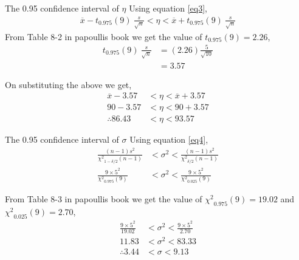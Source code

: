 \documentclass{beamer}
\begin{document}
\begin{frame}{The 0.95 confidence interval of $\eta$}
    Using equation \eqref{eq3}, 
   \begin{align}
      \overline{x} - t_{0.975}(9) \: \frac{s}{\sqrt{n}} < \eta <  \overline{x} + t_{0.975}(9) \: \frac{s}{\sqrt{n}} 
   \end{align}
   From Table 8-2 in papoullis book we get the value of $t_{0.975}(9) = 2.26$,
  \begin{align}
    t_{0.975}(9) \: \frac{s}{\sqrt{n}} &= (2.26)\frac{5}{\sqrt{10}} \\
      								  &= 3.57
  \end{align}
  
   On substituting the above we get,
   \begin{align}
      \overline{x} - 3.57 &< \eta < \overline{x} + 3.57 \\
      90 - 3.57 &< \eta < 90 + 3.57 \\
     \therefore 86.43 &< \eta < 93.57			  
   \end{align}
   
       
\end{frame}
 

\begin{frame}{The 0.95 confidence interval of $\sigma$}
   Using equation \eqref{eq4},
   \begin{align}
      \frac{(n-1) s^2}{{\chi^2}_{1- \delta/2} (n-1)} &< \sigma^2 < \frac{(n-1) s^2}{{\chi^2}_{\delta/2} (n-1)} \\
      \frac{9 \times 5^2}{{\chi^2}_{0.975} (9)} &< \sigma^2 < \frac{9 \times 5^2}{{\chi^2}_{0.025} (9)}
   \end{align}  
     
   From Table 8-3 in papoullis book we get the value of ${\chi^2}_{0.975} (9) = 19.02$ and ${\chi^2}_{0.025} (9) = 2.70$,
   \begin{align}
       \frac{9 \times 5^2}{19.02} &< \sigma^2 < \frac{9 \times 5^2}{2.70} \\
       11.83 &< \sigma^2 < 83.33 \\
     \therefore  3.44 &< \sigma < 9.13
   \end{align}
    
\end{frame}
\end{document}
